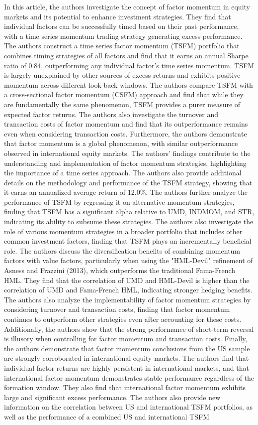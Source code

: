 \documentclass{article}
\begin{document}
In this article, the authors investigate the concept of factor momentum in equity markets and its potential to enhance investment strategies. They find that individual factors can be successfully timed based on their past performance, with a time series momentum trading strategy generating excess performance. The authors construct a time series factor momentum (TSFM) portfolio that combines timing strategies of all factors and find that it earns an annual Sharpe ratio of 0.84, outperforming any individual factor's time series momentum. TSFM is largely unexplained by other sources of excess returns and exhibits positive momentum across different look-back windows. The authors compare TSFM with a cross-sectional factor momentum (CSFM) approach and find that while they are fundamentally the same phenomenon, TSFM provides a purer measure of expected factor returns. The authors also investigate the turnover and transaction costs of factor momentum and find that its outperformance remains even when considering transaction costs. Furthermore, the authors demonstrate that factor momentum is a global phenomenon, with similar outperformance observed in international equity markets. The authors' findings contribute to the understanding and implementation of factor momentum strategies, highlighting the importance of a time series approach. The authors also provide additional details on the methodology and performance of the TSFM strategy, showing that it earns an annualized average return of 12.0\%. The authors further analyze the performance of TSFM by regressing it on alternative momentum strategies, finding that TSFM has a significant alpha relative to UMD, INDMOM, and STR, indicating its ability to subsume these strategies. The authors also investigate the role of various momentum strategies in a broader portfolio that includes other common investment factors, finding that TSFM plays an incrementally beneficial role. The authors discuss the diversification benefits of combining momentum factors with value factors, particularly when using the "HML-Devil" refinement of Asness and Frazzini (2013), which outperforms the traditional Fama-French HML. They find that the correlation of UMD and HML-Devil is higher than the correlation of UMD and Fama-French HML, indicating stronger hedging benefits. The authors also analyze the implementability of factor momentum strategies by considering turnover and transaction costs, finding that factor momentum continues to outperform other strategies even after accounting for these costs. Additionally, the authors show that the strong performance of short-term reversal is illusory when controlling for factor momentum and transaction costs. Finally, the authors demonstrate that factor momentum conclusions from the US sample are strongly corroborated in international equity markets. The authors find that individual factor returns are highly persistent in international markets, and that international factor momentum demonstrates stable performance regardless of the formation window. They also find that international factor momentum exhibits large and significant excess performance. The authors also provide new information on the correlation between US and international TSFM portfolios, as well as the performance of a combined US and international TSFM 
\end{document}
